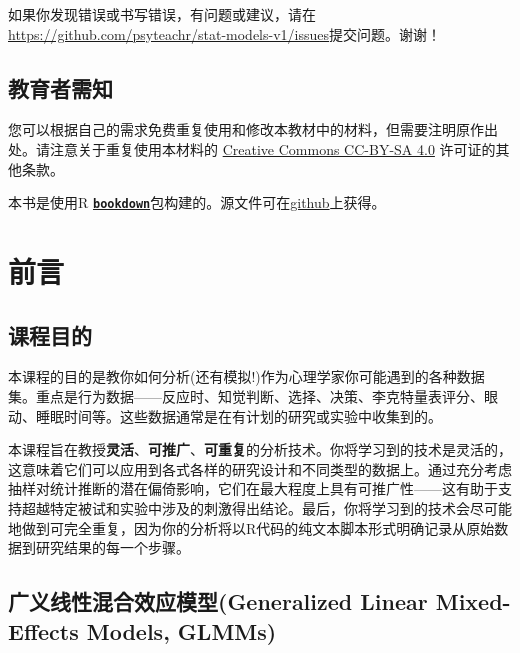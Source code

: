 \documentclass[
]{book}
\begin{document}
如果你发现错误或书写错误，有问题或建议，请在\url{https://github.com/psyteachr/stat-models-v1/issues}提交问题。谢谢！

\hypertarget{ux6559ux80b2ux8005ux9700ux77e5}{%
\section*{教育者需知}\label{ux6559ux80b2ux8005ux9700ux77e5}}

您可以根据自己的需求免费重复使用和修改本教材中的材料，但需要注明原作出处。请注意关于重复使用本材料的 \href{https://creativecommons.org/licenses/by-sa/4.0/}{Creative Commons CC-BY-SA 4.0} 许可证的其他条款。

本书是使用R \href{https://bookdown.org}{\textbf{\texttt{bookdown}}}包构建的。源文件可在\href{https://github.com/psyteachr/stat-models-v1}{github}上获得。

\hypertarget{ux524dux8a00}{%
\chapter{前言}\label{ux524dux8a00}}

\hypertarget{ux8bfeux7a0bux76eeux7684}{%
\section{课程目的}\label{ux8bfeux7a0bux76eeux7684}}

本课程的目的是教你如何分析(还有模拟!)作为心理学家你可能遇到的各种数据集。重点是行为数据------反应时、知觉判断、选择、决策、李克特量表评分、眼动、睡眠时间等。这些数据通常是在有计划的研究或实验中收集到的。

本课程旨在教授\textbf{灵活}、\textbf{可推广}、\textbf{可重复}的分析技术。你将学习到的技术是灵活的，这意味着它们可以应用到各式各样的研究设计和不同类型的数据上。通过充分考虑抽样对统计推断的潜在偏倚影响，它们在最大程度上具有可推广性------这有助于支持超越特定被试和实验中涉及的刺激得出结论。最后，你将学习到的技术会尽可能地做到可完全重复，因为你的分析将以R代码的纯文本脚本形式明确记录从原始数据到研究结果的每一个步骤。

\hypertarget{ux5e7fux4e49ux7ebfux6027ux6df7ux5408ux6548ux5e94ux6a21ux578bgeneralized-linear-mixed-effects-models-glmms}{%
\section{广义线性混合效应模型(Generalized Linear Mixed-Effects Models, GLMMs)}\label{ux5e7fux4e49ux7ebfux6027ux6df7ux5408ux6548ux5e94ux6a21ux578bgeneralized-linear-mixed-effects-models-glmms}}
\end{document}

